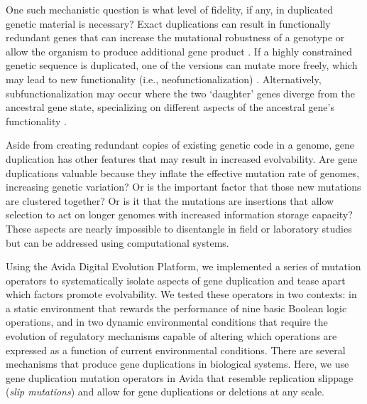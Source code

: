 One such mechanistic question is what level of fidelity, if any, in duplicated genetic material is necessary?
Exact duplications can result in functionally redundant genes that can increase the mutational robustness of a genotype \citep{Crow:2006role} or allow the organism to produce additional gene product \citep{Zhang:2003fw}.
If a highly constrained genetic sequence is duplicated, one of the versions can mutate more freely, which may lead to new functionality (i.e., neofunctionalization) \citep{Zhang:2003fw,Wagner:2003fk}.
Alternatively, subfunctionalization may occur where the two `daughter' genes diverge from the ancestral gene state, specializing on different aspects of the ancestral gene's functionality \citep{Zhang:2003fw}.

Aside from creating redundant copies of existing genetic code in a genome, gene duplication has other features that may result in increased evolvability.
Are gene duplications valuable because they inflate the effective mutation rate of genomes, increasing genetic variation?
Or is the important factor that those new mutations are clustered together?
Or is it that the mutations are insertions that allow selection to act on longer genomes with increased information storage capacity?
These aspects are nearly impossible to disentangle in field or laboratory studies but can be addressed using computational systems.

Using the Avida Digital Evolution Platform, we implemented a series of mutation operators to systematically isolate aspects of gene duplication and tease apart which factors promote evolvability. We tested these operators in two %
contexts: in a static environment that rewards the performance of nine basic Boolean logic operations, and in two dynamic environmental conditions that require the evolution of regulatory mechanisms capable of altering which operations are expressed as a function of current environmental conditions. %
There are several mechanisms that produce gene duplications in biological systems. Here, we use gene duplication mutation operators in Avida that resemble replication slippage \citep{bzymek_instability_2001} (\textit{slip mutations}) and allow for gene duplications or deletions at any scale.

